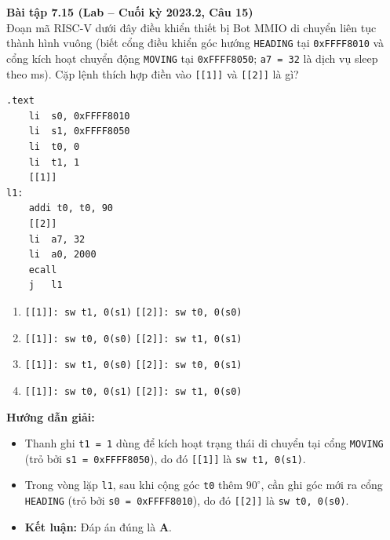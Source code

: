\textbf{Bài tập 7.15 (Lab -- Cuối kỳ 2023.2, Câu 15)}\\
Đoạn mã RISC-V dưới đây điều khiển thiết bị Bot MMIO di chuyển liên tục thành hình vuông (biết cổng điều khiển góc hướng \texttt{HEADING} tại \texttt{0xFFFF8010} và cổng kích hoạt chuyển động \texttt{MOVING} tại \texttt{0xFFFF8050}; \texttt{a7 = 32} là dịch vụ sleep theo ms). Cặp lệnh thích hợp điền vào \texttt{[[1]]} và \texttt{[[2]]} là gì?
\begin{lstlisting}
.text
    li  s0, 0xFFFF8010
    li  s1, 0xFFFF8050
    li  t0, 0
    li  t1, 1
    [[1]]
l1:
    addi t0, t0, 90
    [[2]]
    li  a7, 32
    li  a0, 2000
    ecall
    j   l1
\end{lstlisting}
\begin{enumerate}[label=\Alph*.]
    \item \texttt{[[1]]: sw t1, 0(s1)} \textbar{} \texttt{[[2]]: sw t0, 0(s0)}
    \item \texttt{[[1]]: sw t0, 0(s0)} \textbar{} \texttt{[[2]]: sw t1, 0(s1)}
    \item \texttt{[[1]]: sw t1, 0(s0)} \textbar{} \texttt{[[2]]: sw t0, 0(s1)}
    \item \texttt{[[1]]: sw t0, 0(s1)} \textbar{} \texttt{[[2]]: sw t1, 0(s0)}
\end{enumerate}
\textbf{Hướng dẫn giải:}
\begin{itemize}
    \item Thanh ghi \texttt{t1 = 1} dùng để kích hoạt trạng thái di chuyển tại cổng \texttt{MOVING} (trỏ bởi \texttt{s1 = 0xFFFF8050}), do đó \texttt{[[1]]} là \texttt{sw t1, 0(s1)}.
    \item Trong vòng lặp \texttt{l1}, sau khi cộng góc \texttt{t0} thêm $90^\circ$, cần ghi góc mới ra cổng \texttt{HEADING} (trỏ bởi \texttt{s0 = 0xFFFF8010}), do đó \texttt{[[2]]} là \texttt{sw t0, 0(s0)}.
    \item \textbf{Kết luận:} Đáp án đúng là \textbf{A}.
\end{itemize}

